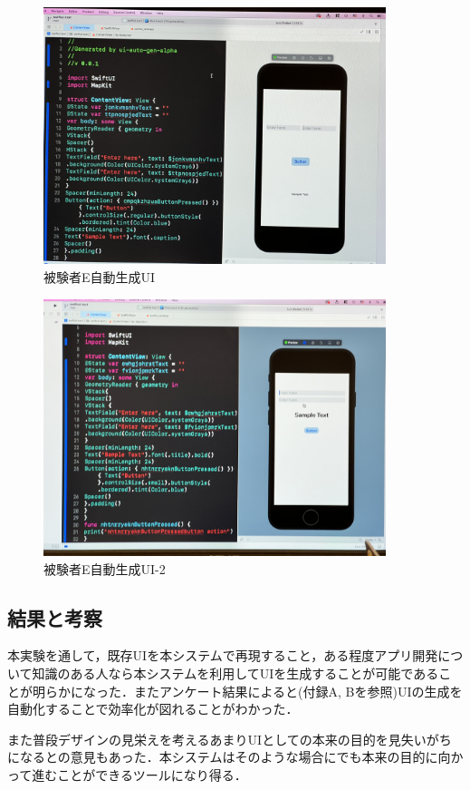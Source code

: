 \begin{figure}[htbp]
  \begin{minipage}{\hsize}
    \begin{center}
       \includegraphics[width=100mm]{img/usertest_autogen_5-1.jpeg}
    \end{center}
    \caption{被験者E自動生成UI}
    \label{fig:usertest_autogen_5-1}
  \end{minipage}
\end{figure}

\begin{figure}[htbp]
  \begin{minipage}{\hsize}
    \begin{center}
       \includegraphics[width=100mm]{img/usertest_autogen_5-2.jpeg}
    \end{center}
    \caption{被験者E自動生成UI-2}
    \label{fig:usertest_autogen_5-2}
  \end{minipage}
\end{figure}



\subsection{結果と考察}
本実験を通して，既存UIを本システムで再現すること，ある程度アプリ開発について知識のある人なら本システムを利用してUIを生成することが可能であることが明らかになった．またアンケート結果によると(付録A, Bを参照)UIの生成を自動化することで効率化が図れることがわかった．

また普段デザインの見栄えを考えるあまりUIとしての本来の目的を見失いがちになるとの意見もあった．本システムはそのような場合にでも本来の目的に向かって進むことができるツールになり得る．






















